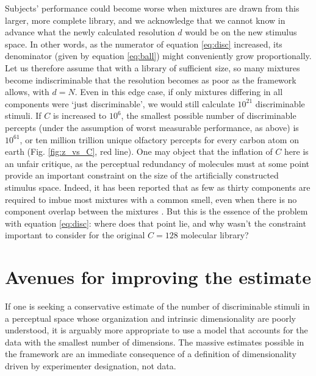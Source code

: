 \documentclass[letterpaper,twocolumn,10pt]{article}
\begin{document}
Subjects' performance could become worse when mixtures are drawn from this larger, more complete library, 
and we acknowledge that we cannot know in advance what the newly calculated resolution $d$ would be on the new stimulus space.  
In other words, as the numerator of equation \ref{eq:disc} increased, 
its denominator (given by equation \ref{eq:ball}) might conveniently grow proportionally.  
Let us therefore assume that with a library of sufficient size, 
so many mixtures become indiscriminable that the resolution becomes as poor as the framework allows, with $d=N$. 
Even in this edge case, if only mixtures differing in all components were `just discriminable', 
we would still calculate $10^{21}$ discriminable stimuli. 
If $C$ is increased to $10^6$, 
the smallest possible number of discriminable percepts 
(under the assumption of worst measurable performance, as above) 
is $10^{61}$, or ten million trillion unique olfactory percepts for every carbon atom on earth (Fig. \ref{fig:z_vs_C}, red line). 
One may object that the inflation of $C$ here is an unfair critique, 
as the perceptual redundancy of molecules must at some point provide an important constraint on the size of the artificially constructed stimulus space. 
Indeed, it has been reported that as few as thirty components are required to imbue most mixtures with a common smell, 
even when there is no component overlap between the mixtures \cite{weiss_perceptual_2012}.
But this is the essence of the problem with equation \ref{eq:disc}: 
where does that point lie, 
and why wasn't the constraint important to consider for the original $C=128$ molecular library?

\section{Avenues for improving the estimate}

If one is seeking a conservative estimate of the number of discriminable stimuli in a perceptual space whose organization and intrinsic dimensionality are poorly understood, it is arguably more appropriate to use a model that accounts for the data with the smallest number of dimensions. The massive estimates possible in the framework are an immediate consequence of a definition of dimensionality driven by experimenter designation, not data. 
\end{document}
